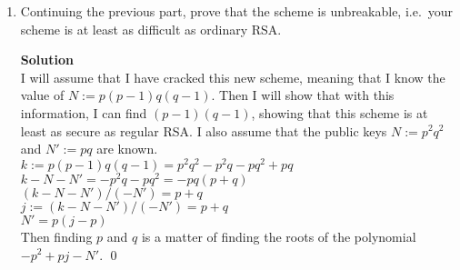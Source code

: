 \documentclass[11pt]{article}
\newenvironment{Parts}{\begin{enumerate}[label=(\alph*)]}{\end{enumerate}}
\newcommand*{\Part}{\item}
\begin{document}
\begin{Parts}
  \Part Continuing the previous part, prove that the scheme is unbreakable, i.e.\ your scheme is at least as difficult as ordinary RSA.
\begin{mdframed} \textbf{Solution} \\
I will assume that I have cracked this new scheme, meaning that I know the value of $N:=p(p-1)q(q-1)$. Then I will show that with this information, I can find $(p-1)(q-1)$, showing that this scheme is at least as secure as regular RSA. I also assume that the public keys $N := p^2q^2$ and $N':=pq$ are known. \\
$k:=p(p-1)q(q-1)=p^2q^2-p^2q-pq^2+pq$ \\
$k-N-N'=-p^2q-pq^2=-pq(p+q)$ \\
$(k-N-N')/(-N')=p+q$ \\
$j:=(k-N-N')/(-N')=p+q$ \\
$N'=p(j-p)$ \\
Then finding $p$ and $q$ is a matter of finding the roots of the polynomial $-p^2+pj-N'$. \qed
\end{mdframed}

\end{Parts}
\end{document}
